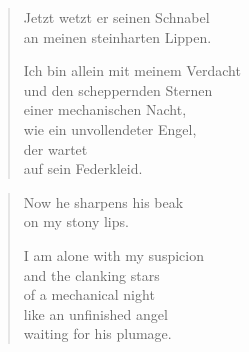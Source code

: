 \clearpage

\begin{verse}

Jetzt wetzt er seinen Schnabel\\
an meinen steinharten Lippen.

Ich bin allein mit meinem Verdacht\\
und den scheppernden Sternen\\
einer mechanischen Nacht,\\
wie ein unvollendeter Engel,\\
der wartet\\
auf sein Federkleid.
\end{verse}

\clearpage

\begin{verse}
Now he sharpens his beak\\
on my stony lips.

I am alone with my suspicion\\
and the clanking stars\\
of a mechanical night\\
like an unfinished angel\\
waiting for his plumage.
\end{verse}

